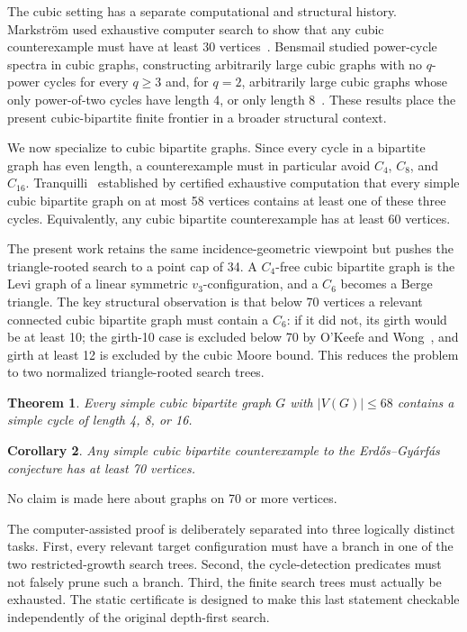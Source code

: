 \documentclass[11pt]{article}
\newtheorem{theorem}{Theorem}[section]
\newtheorem{corollary}[theorem]{Corollary}
\theoremstyle{remark}
\newcommand{\Cfour}{C_4}
\newcommand{\Csix}{C_6}
\newcommand{\Ceight}{C_8}
\newcommand{\Csixteen}{C_{16}}
\newcommand{\vthree}{v_3}
\begin{document}
The cubic setting has a separate computational and structural history.  Markstr\"om used exhaustive computer search to show that any cubic counterexample must have at least 30 vertices~\cite{markstrom2004}.  Bensmail studied power-cycle spectra in cubic graphs, constructing arbitrarily large cubic graphs with no \(q\)-power cycles for every \(q\ge 3\) and, for \(q=2\), arbitrarily large cubic graphs whose only power-of-two cycles have length 4, or only length 8~\cite{bensmail2017}.  These results place the present cubic-bipartite finite frontier in a broader structural context.

We now specialize to cubic bipartite graphs.  Since every cycle in a bipartite graph has even length, a counterexample must in particular avoid \(\Cfour\), \(\Ceight\), and \(\Csixteen\).  Tranquilli~\cite{tranquilli2026} established by certified exhaustive computation that every simple cubic bipartite graph on at most 58 vertices contains at least one of these three cycles.  Equivalently, any cubic bipartite counterexample has at least 60 vertices.

The present work retains the same incidence-geometric viewpoint but pushes the triangle-rooted search to a point cap of 34.  A \(\Cfour\)-free cubic bipartite graph is the Levi graph of a linear symmetric \(\vthree\)-configuration, and a \(\Csix\) becomes a Berge triangle.  The key structural observation is that below 70 vertices a relevant connected cubic bipartite graph must contain a \(\Csix\): if it did not, its girth would be at least 10; the girth-10 case is excluded below 70 by O'Keefe and Wong~\cite{okeefe1980}, and girth at least 12 is excluded by the cubic Moore bound.  This reduces the problem to two normalized triangle-rooted search trees.

\begin{theorem}\label{thm:main}
Every simple cubic bipartite graph \(G\) with \(|V(G)|\le 68\) contains a simple cycle of length 4, 8, or 16.
\end{theorem}

\begin{corollary}\label{cor:70}
Any simple cubic bipartite counterexample to the Erd\H{o}s--Gy\'arf\'as conjecture has at least 70 vertices.
\end{corollary}

No claim is made here about graphs on 70 or more vertices.

The computer-assisted proof is deliberately separated into three logically distinct tasks.  First, every relevant target configuration must have a branch in one of the two restricted-growth search trees.  Second, the cycle-detection predicates must not falsely prune such a branch.  Third, the finite search trees must actually be exhausted.  The static certificate is designed to make this last statement checkable independently of the original depth-first search.
\end{document}
